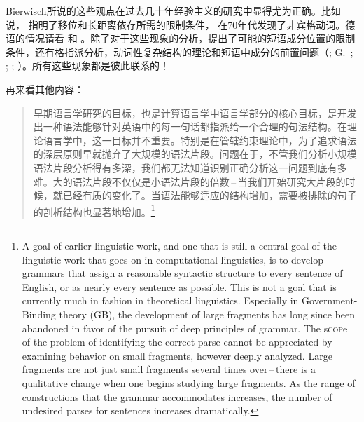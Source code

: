 Bierwisch所说的这些观点在过去几十年经验主义的研究中显得尤为正确。比如说， \citet{Ross67}指明了移位和长距离依存所需的限制条件， \citet{Perlmutter78}在70年代发现了非宾格动词。德语的情况请看 和 。除了对于这些现象的分析，\citep{Lenerz77}提出了可能的短语成分位置的限制条件，还有格指派分析\citep*{YMJ87,Meurers99b,Prze99}，动词性复杂结构的理论和短语中成分的前置问题（\citealp{Evers75a,Grewendorf88a,HN94a,Kiss95a}; G.\ \citealp{GMueller98a};
\citealp{Meurers99c}; \citealp{Mueller99a,Mueller2002b}; \citealp{deKuthy2002a}）。所有这些现象都是彼此联系的！

再来看其他内容：
\begin{quotation}
早期语言学研究的目标，也是计算语言学中语言学部分的核心目标，是开发出一种语法能够针对英语中的每一句话都指派给一个合理的句法结构。在理论语言学中，这一目标并不重要。特别是在管辖约束理论中，为了追求语法的深层原则早就抛弃了大规模的语法片段。问题在于，不管我们分析小规模语法片段分析得有多深，我们都无法知道识别正确分析这一问题到底有多难。大的语法片段不仅仅是小语法片段的倍数\,--\,当我们开始研究大片段的时候，就已经有质的变化了。当语法能够适应的结构增加，需要被排除的句子的剖析结构也显著地增加。\citep[]{Abney96a}\footnote{
A goal of earlier linguistic work, and one that is still a central goal of the
linguistic work that goes on in computational linguistics, is to develop grammars
that assign a reasonable syntactic structure to every sentence of English,
or as nearly every sentence as possible. This is not a goal that is currently much
in fashion in theoretical linguistics. Especially in Government-Binding theory
(GB), the development of large fragments has long since been abandoned in
favor of the pursuit of deep principles of grammar.
The s\textsc{cop}e of the problem of identifying the correct parse cannot be appreciated
by examining behavior on small fragments, however deeply analyzed.
Large fragments are not just small fragments several times over\,--\,there is a
qualitative change when one begins studying large fragments. As the range of
constructions that the grammar accommodates increases, the number of undesired parses for sentences increases dramatically.
}
\end{quotation}

